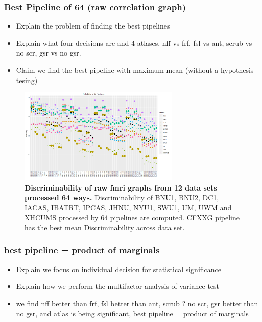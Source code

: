 \documentclass{article}
\begin{document}
\subsubsection{Best Pipeline of 64 (raw correlation graph)}
\begin{itemize}
	\item Explain the problem of finding the best pipelines
	\item Explain what four decisions are  and 4 atlases, nff vs frf, fsl vs ant, scrub vs no scr, gsr vs no gsr. 
	\item Claim we find the best pipeline with maximum mean (without a hypothesis tesing)
\end{itemize}

\begin{figure}[t!]
\includegraphics[width=3.0in]{../Figs/64_pipelines_size.png}
\caption{{\bf Discriminability of raw fmri graphs from 12 data sets processed 64 ways.}  Discriminability of BNU1, BNU2, DC1, IACAS, IBATRT, IPCAS, JHNU, NYU1, SWU1, UM, UWM and XHCUMS processed by 64 pipelines are computed. CFXXG pipeline has the best mean Discriminability across data set. }
\label{fig:6}
\end{figure}


\subsubsection{best pipeline = product of marginals}
\begin{itemize}
	\item Explain we focus on individual decision for statistical significance
	\item Explain how we perform the multifactor analysis of variance test
	\item we find nff better than frf, fsl better than ant, scrub ? no scr, gsr better than no gsr, and atlas is being significant, best pipeline = product of marginals
\end{itemize}
\end{document}
